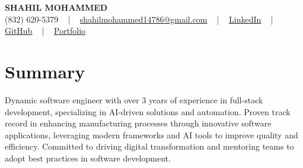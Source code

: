 \documentclass[letterpaper,10pt]{article}
\begin{document}
\begin{center}
    {\fontsize{14pt}{12pt}\selectfont \textbf{\MakeUppercase{Shahil Mohammed}}}\\ \vspace{2pt}
    \fontsize{10pt}{12pt}\selectfont (832) 620-5379 ~ | ~ \href{mailto:shahilmohammed14786@gmail.com}{shahilmohammed14786@gmail.com} ~ | ~  
    \href{https://www.linkedin.com/in/shahil-mohammed-9652931a1/}{\color{blue}\underline{LinkedIn}}  ~ | ~ 
    \href{https://github.com/freakbeast14}{\color{blue}\underline{GitHub}} ~ | ~ 
    \href{https://shahil-mohammed.netlify.app/}{\color{blue}\underline{Portfolio}}
    \vspace{-8pt}
\end{center}

\section{Summary}
\vspace{-2pt}\fontsize{8pt}{9pt}\selectfont
Dynamic software engineer with over 3 years of experience in full-stack development, specializing in AI-driven solutions and automation. Proven track record in enhancing manufacturing processes through innovative software applications, leveraging modern frameworks and AI tools to improve quality and efficiency. Committed to driving digital transformation and mentoring teams to adopt best practices in software development.
 \vspace{-5pt}
 
\vspace{-2pt}
\end{document}
